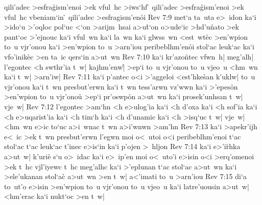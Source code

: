 qili'adec
>esfra\r{g}ism'enoi
>ek
vful~hc
>iws`hf
\ib\r{}
qili'adec
>esfra\r{g}ism'enoi
>ek
vful~hc
vbeniam`in
\ib\r{}
qili'adec
>esfragism'en\r{o}i\bibvsend
{}
\vs Rev 7:9
met`a
ta~uta
e>~idon
ka`i
>ido`u
>'oqloc
pol`uc
<`on
>arijm~hsai
a>u\r{t}`on
o>ude`ic
>hd'u\r{n}ato
>ek
pant`oc
>'ejnouc
ka`i
vful~wn
ka`i
la~wn
ka`i
glwss~wn
<est~wt\r{e}c
>en'wpion
to~u
vjr'onou
ka`i
>en'wpion
to~u
>arn'iou
peribeblhm'en\r{o}i
stol`ac
leuk`ac
ka`i
vfo'inik\r{e}c
>en
ta~ic
qers`in
a>ut~wn\bibvsend
\vs Rev 7:10
ka`i
kr'azo\r{n}tec
vfwn~h|
meg'alh|
l'egontec
<h
swthr'ia
t~w|
kajhm'enw|\r{}
>ep`i
to~u
vjr'onou
to~u
vjeo~u
<hm~wn
ka`i
t~w|
>arn'iw|\bibvsend
\vs Rev 7:11
ka`i
p'antec
o<i
>'aggeloi
<est'hke\r{s}an
k'uklw|
to~u
vjr'onou
ka`i
t~wn
presbut'erwn
ka`i
t~wn
tess'arwn
vz'wwn
ka`i
>'epes\r{o}n
>en'wpion
to~u
vjr'ono\r{u}
>ep`i
pr'oswp\r{o}n
a>ut~wn
ka`i
prosek'unhsan
t~w|
vje~w|\bibvsend
\vs Rev 7:12
l'egontec
>am`hn
<h
e>ulog'ia
ka`i
<h
d'oxa
ka`i
<h
sof'ia
ka`i
<h
e>uqarist'ia
ka`i
<h
tim`h
ka`i
<h
d'unamic
ka`i
<h
>isq`uc
t~w|
vje~w|
<hm~wn
e>ic
to`uc
a>i~wnac
t~wn
a>i'wnwn
>am'hn\bibvsend
\vs Rev 7:13
ka`i
>apekr'ijh
e<~ic
>ek
t~wn
presbut'erwn
l'egwn
moi
o<~utoi
o<i
peribeblhm'enoi
t`ac
stol`ac
t`ac
leuk`ac
t'inec
e>is`in
ka`i
p'ojen
>~hljon\bibvsend
\vs Rev 7:14
ka`i
e>'i\r{r}hka
a>ut~w|
k'uri\r{e}
s`u
o>~idac
ka`i
e>~ip'en
moi
o<~uto'i
e>isin
o<i
>erq'omenoi
>ek
t~hc
vjl'iyewc
t~hc
meg'alhc
ka`i
>'eplunan
t`ac
stol`ac
a>ut~wn
ka`i
>ele'ukanan
stol`ac\r{}
a>ut~wn
>en
t~w|
a<'imati
to~u
>arn'iou\bibvsend
\vs Rev 7:15
di`a
to~ut'o
e>isin
>en'wpion
to~u
vjr'onou
to~u
vjeo~u
ka`i
latre'uousin
a>ut~w|
<hm'erac
ka`i
nukt`oc
>en
t~w|
